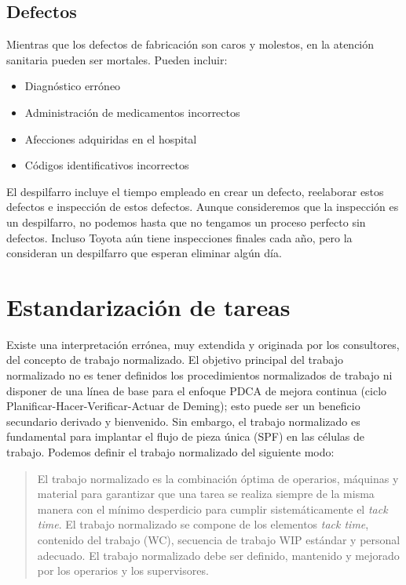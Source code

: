 \subsection{Defectos}

Mientras que los defectos de fabricación son caros y molestos, en la atención sanitaria pueden ser mortales.
Pueden incluir:

\begin{itemize}
    \item Diagnóstico erróneo
    \item Administración de medicamentos incorrectos
    \item Afecciones adquiridas en el hospital
    \item Códigos identificativos incorrectos
\end{itemize}

El despilfarro incluye el tiempo empleado en crear un defecto, reelaborar estos defectos e inspección de estos defectos.
Aunque consideremos que la inspección es un despilfarro, no podemos hasta que no tengamos un proceso perfecto sin defectos.
Incluso Toyota aún tiene inspecciones finales cada año, pero la consideran un despilfarro que esperan eliminar algún día.

\section{Estandarización de tareas}

Existe una interpretación errónea, muy extendida y originada por los consultores, del concepto de trabajo normalizado.
El objetivo principal del trabajo normalizado no es tener definidos los procedimientos normalizados de trabajo ni disponer de una línea de base para el enfoque PDCA de mejora continua (ciclo Planificar-Hacer-Verificar-Actuar de Deming); esto puede ser un beneficio secundario derivado y bienvenido.
Sin embargo, el trabajo normalizado es fundamental para implantar el flujo de pieza única (SPF) en las células de trabajo. Podemos definir el trabajo normalizado del siguiente modo:

\begin{quote}
    El trabajo normalizado es la combinación óptima de operarios, máquinas y material para garantizar que una tarea se realiza siempre de la misma manera con el mínimo desperdicio para cumplir sistemáticamente el \textit{tack time}.
    El trabajo normalizado se compone de los elementos \textit{tack time}, contenido del trabajo (WC), secuencia de trabajo WIP estándar y personal adecuado.
    El trabajo normalizado debe ser definido, mantenido y mejorado por los operarios y los supervisores.
\end{quote}

